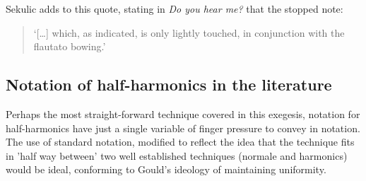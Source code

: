 Sekulic adds to this quote, stating in \emph{Do you hear me?} that the stopped note:
\begin{quotation}
  `[\ldots] which, as indicated, is only lightly touched, in conjunction with the flautato bowing.'\autocite[28]{sekulicYouHearMe2012}
\end{quotation}

\subsection{Notation of half-harmonics in the literature}
Perhaps the most straight-forward technique covered in this exegesis, notation for half-harmonics have just a single variable of finger pressure to convey in notation.
The use of standard notation, modified to reflect the idea that the technique fits in 'half way between' two well established techniques (normale and harmonics) would be ideal, conforming to Gould's ideology of maintaining uniformity.



